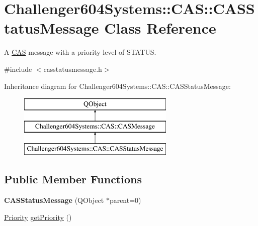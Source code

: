 \hypertarget{class_challenger604_systems_1_1_c_a_s_1_1_c_a_s_status_message}{\section{Challenger604\-Systems\-:\-:C\-A\-S\-:\-:C\-A\-S\-Status\-Message Class Reference}
\label{class_challenger604_systems_1_1_c_a_s_1_1_c_a_s_status_message}
}


A \hyperlink{namespace_challenger604_systems_1_1_c_a_s}{C\-A\-S} message with a priority level of S\-T\-A\-T\-U\-S.  




{\ttfamily \#include $<$casstatusmessage.\-h$>$}

Inheritance diagram for Challenger604\-Systems\-:\-:C\-A\-S\-:\-:C\-A\-S\-Status\-Message\-:\begin{figure}[H]
\begin{center}
\leavevmode
\includegraphics[height=3.000000cm]{class_challenger604_systems_1_1_c_a_s_1_1_c_a_s_status_message}
\end{center}
\end{figure}
\subsection*{Public Member Functions}
\begin{DoxyCompactItemize}
\item 
\hypertarget{class_challenger604_systems_1_1_c_a_s_1_1_c_a_s_status_message_a15528b578a6cb330b6d6489e50dcaa8c}{{\bfseries C\-A\-S\-Status\-Message} (Q\-Object $\ast$parent=0)}\label{class_challenger604_systems_1_1_c_a_s_1_1_c_a_s_status_message_a15528b578a6cb330b6d6489e50dcaa8c}

\item 
\hyperlink{class_challenger604_systems_1_1_c_a_s_1_1_c_a_s_message_a5a503c8cb9618403fcd342dca9ba1ca9}{Priority} \hyperlink{class_challenger604_systems_1_1_c_a_s_1_1_c_a_s_status_message_ac6a98cf31cf0b5912425b2a87c17ba62}{get\-Priority} ()
\end{DoxyCompactItemize}
